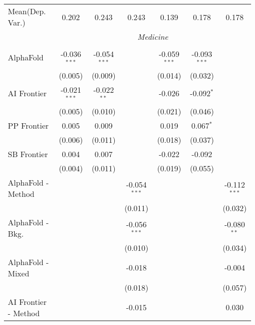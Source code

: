 \begin{tabular}{lcccccc}
Mean(Dep. Var.) & 0.202 & 0.243 & 0.243 & 0.139 & 0.178 & 0.178 \\
 & \multicolumn{6}{c}{\textit{Medicine}} \\ \\
   AlphaFold            & -0.036$^{***}$ & -0.054$^{***}$ &                & -0.059$^{***}$ & -0.093$^{***}$ &   \\   
                        & (0.005)        & (0.009)        &                & (0.014)        & (0.032)        &   \\   
   AI Frontier          & -0.021$^{***}$ & -0.022$^{**}$  &                & -0.026         & -0.092$^{*}$   &   \\   
                        & (0.005)        & (0.010)        &                & (0.021)        & (0.046)        &   \\   
   PP Frontier          & 0.005          & 0.009          &                & 0.019          & 0.067$^{*}$    &   \\   
                        & (0.006)        & (0.011)        &                & (0.018)        & (0.037)        &   \\   
   SB Frontier          & 0.004          & 0.007          &                & -0.022         & -0.092         &   \\   
                        & (0.004)        & (0.011)        &                & (0.019)        & (0.055)        &   \\   
   AlphaFold - Method   &                &                & -0.054$^{***}$ &                &                & -0.112$^{***}$\\   
                        &                &                & (0.011)        &                &                & (0.032)\\   
   AlphaFold - Bkg.     &                &                & -0.056$^{***}$ &                &                & -0.080$^{**}$\\   
                        &                &                & (0.010)        &                &                & (0.034)\\   
   AlphaFold - Mixed    &                &                & -0.018         &                &                & -0.004\\   
                        &                &                & (0.018)        &                &                & (0.057)\\   
   AI Frontier - Method &                &                & -0.015         &                &                & 0.030\\   

\end{tabular}
